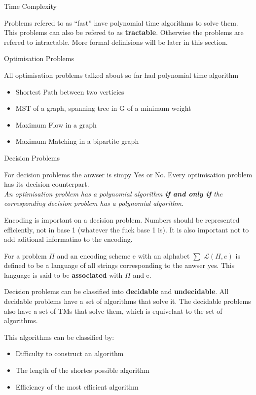 \documentclass[12pt, letterpaper]{article}
\begin{document}
\begin{section}{Time Complexity}

  Problems refered to as ``fast'' have polynomial time algorithms to solve them.
  This problems can also be refered to as \textbf{tractable}. Otherwise the
  problems are refered to intractable. More formal definisions will be later
  in this section.

  \begin{subsection}{Optimisation Problems}

    All optimisation problems talked about so far had polynomial time algorithm
    \begin{itemize}
      \item Shortest Path between two verticies
      \item MST of a graph, spanning tree in G of a minimum weight
      \item Maximum Flow in a graph
      \item Maximum Matching in a bipartite graph
    \end{itemize}

  \end{subsection}

  \begin{subsection}{Decision Problems}

    For decision problems the anwser is simpy Yes or No. Every optimisation
    problem has its decision counterpart. \\
    \emph{An optimisation problem has a polynomial algorithm \textbf{if and only if}
      the corresponding decision problem has a polynomial algorithm.}

    Encoding is important on a decision problem. Numbers should be represented
    efficiently, not in base 1 (whatever the fuck base 1 is). It is also
    important not to add aditional informatino to the encoding.

    For a problem \(\Pi\) and an encoding scheme e with an alphabet \(\sum\)
    \(\mathscr{L}(\Pi, e)\) is defined to be a language of all strings corresponding
    to the anwser yes. This language is said to be \textbf{associated} with \(\Pi\) and e.

    Decision problems can be classified into \textbf{decidable} and \textbf{undecidable}.
    All decidable problems have a set of algorithms that solve it. The decidable
    problems also have a set of TMs that solve them, which is equivelant to
    the set of algorithms.

    This algorithms can be classified by:
    \begin{itemize}
      \item Difficulty to construct an algorithm
      \item The length of the shortes possible algorithm
      \item Efficiency of the most efficient algorithm
    \end{itemize}


\end{subsection}
\end{section}
\end{document}
